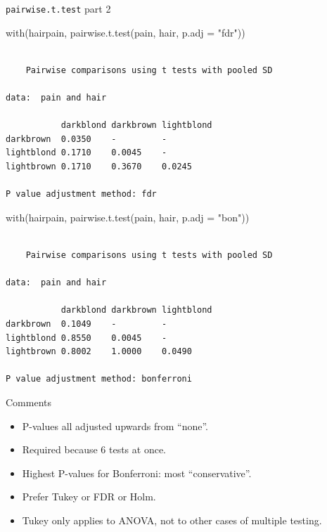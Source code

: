 \documentclass[
  ignorenonframetext,
]{beamer}
\newenvironment{Shaded}{\begin{snugshade}}{\end{snugshade}}
\newcommand{\AttributeTok}[1]{\textcolor[rgb]{0.40,0.45,0.13}{#1}}
\newcommand{\FunctionTok}[1]{\textcolor[rgb]{0.28,0.35,0.67}{#1}}
\newcommand{\NormalTok}[1]{\textcolor[rgb]{0.00,0.23,0.31}{#1}}
\newcommand{\StringTok}[1]{\textcolor[rgb]{0.13,0.47,0.30}{#1}}
\begin{document}
\begin{frame}[fragile]{\texttt{pairwise.t.test} part 2}
\protect\hypertarget{pairwise.t.test-part-2}{}
\tiny

\begin{Shaded}
\begin{Highlighting}[]
\FunctionTok{with}\NormalTok{(hairpain, }\FunctionTok{pairwise.t.test}\NormalTok{(pain, hair, }\AttributeTok{p.adj =} \StringTok{"fdr"}\NormalTok{))}
\end{Highlighting}
\end{Shaded}

\begin{verbatim}

    Pairwise comparisons using t tests with pooled SD 

data:  pain and hair 

           darkblond darkbrown lightblond
darkbrown  0.0350    -         -         
lightblond 0.1710    0.0045    -         
lightbrown 0.1710    0.3670    0.0245    

P value adjustment method: fdr 
\end{verbatim}

\begin{Shaded}
\begin{Highlighting}[]
\FunctionTok{with}\NormalTok{(hairpain, }\FunctionTok{pairwise.t.test}\NormalTok{(pain, hair, }\AttributeTok{p.adj =} \StringTok{"bon"}\NormalTok{))}
\end{Highlighting}
\end{Shaded}

\begin{verbatim}

    Pairwise comparisons using t tests with pooled SD 

data:  pain and hair 

           darkblond darkbrown lightblond
darkbrown  0.1049    -         -         
lightblond 0.8550    0.0045    -         
lightbrown 0.8002    1.0000    0.0490    

P value adjustment method: bonferroni 
\end{verbatim}

\normalsize
\end{frame}

\begin{frame}{Comments}
\protect\hypertarget{comments}{}
\begin{itemize}
\item
  P-values all adjusted upwards from ``none''.
\item
  Required because 6 tests at once.
\item
  Highest P-values for Bonferroni: most ``conservative''.
\item
  Prefer Tukey or FDR or Holm.
\item
  Tukey only applies to ANOVA, not to other cases of multiple testing.
\end{itemize}
\end{frame}
\end{document}
